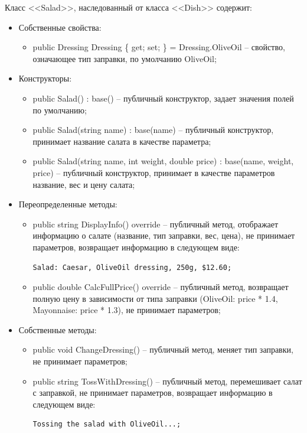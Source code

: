 \documentclass[a4paper,14pt]{extarticle}
\begin{document}
Класс <<Salad>>, наследованный от класса <<Dish>> содержит:
\begin{itemize}
  \item[--] Собственные свойства:
  \begin{itemize}
    \item[--] public Dressing Dressing \{ get; set; \} = Dressing.OliveOil -- свойство, означающее тип заправки, по умолчанию OliveOil;
  \end{itemize}
  \item[--] Конструкторы:
  \begin{itemize}
    \item[--] public Salad() : base() -- публичный конструктор, задает значения полей по умолчанию;
    \item[--] public Salad(string name) : base(name) -- публичный конструктор, принимает название салата в качестве параметра;
    \item[--] public Salad(string name, int weight, double price) : base(name, weight, price) -- публичный конструктор, принимает в качестве параметров название, вес и цену салата;
  \end{itemize}
  \item[--] Переопределенные методы:
  \begin{itemize}
    \item[--] public string DisplayInfo() override -- публичный метод, отображает информацию о салате (название, тип заправки, вес, цена), не принимает параметров, возвращает информацию в следующем виде:
    \begin{Verbatim}[tabsize=4]
Salad: Caesar, OliveOil dressing, 250g, $12.60;
    \end{Verbatim}
    \item[--] public double CalcFullPrice() override -- публичный метод, возвращает полную цену в зависимости от типа заправки (OliveOil: price * 1.4, Mayonnaise: price * 1.3), не принимает параметров;
  \end{itemize}
  \item[--] Собственные методы:
  \begin{itemize}
    \item[--] public void ChangeDressing() -- публичный метод, меняет тип заправки, не принимает параметров;
    \item[--] public string TossWithDressing() -- публичный метод, перемешивает салат с заправкой, не принимает параметров, возвращает информацию в следующем виде:
    \begin{Verbatim}[tabsize=4]
Tossing the salad with OliveOil...;
    \end{Verbatim}
  \end{itemize}
\end{itemize}
\end{document}
